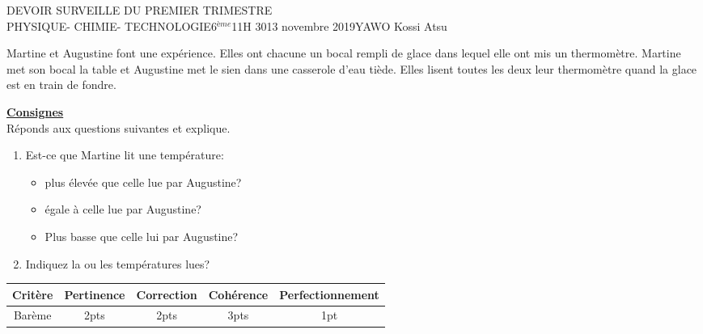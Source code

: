 \documentclass[12pt,a4paper]{book}
\newcommand{\prof}{YAWO Kossi Atsu}
\newcommand{\matiere}{\\PHYSIQUE- CHIMIE- TECHNOLOGIE}
\newcommand{\classe}{6$^{ème}$}
\begin{document}
\begin{devoir}{DEVOIR SURVEILLE DU PREMIER TRIMESTRE}{\matiere}{\classe}{1}{1H 30}{13 novembre 2019}{\prof}
\begin{exo}[8]
\begin{multicols}{2}
Martine et Augustine font une expérience. Elles ont chacune un bocal rempli de glace dans lequel elle ont mis un thermomètre. Martine met son bocal la table et Augustine met le sien dans une casserole d'eau tiède. Elles lisent toutes les deux leur thermomètre quand la glace est en train de fondre.

\vspace{0.5cm}

\underline{\textbf{Consignes}}\\
Réponds aux questions suivantes et explique.
\begin{enumerate}
\item Est-ce que Martine lit une température:
\begin{itemize}
\item plus élevée que celle lue par Augustine?
\item égale à celle lue par Augustine?
\item Plus basse que celle lui par Augustine?
\end{itemize}
\item Indiquez la ou les températures lues?
\end{enumerate}

\end{multicols}
\begin{tabular}{|c|c|c|c|c|}
\hline 
Critère & Pertinence & Correction & Cohérence & Perfectionnement \\ 
\hline
Barème & 2pts & 2pts & 3pts & 1pt \\ 
\hline 
\end{tabular}

\end{exo}


\end{devoir}
\end{document}

